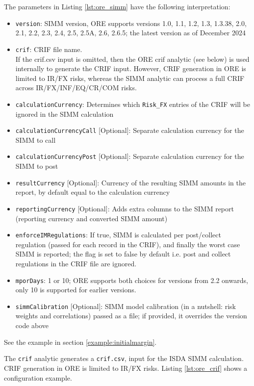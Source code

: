{The parameters in Listing \ref{lst:ore_simm} have the following interpretation:

\begin{itemize}
\item {\tt version}: SIMM version, ORE supports versions 1.0, 1.1, 1.2, 1.3, 1.3.38, 2.0, 2.1, 2.2, 2.3, 2.4, 2.5, 2.5A, 2.6, 2.6.5; the latest version as of December 2024
\item {\tt crif}: CRIF file name. \\
  If the crif.csv input is omitted, then the ORE crif analytic (see below) is used internally to generate the CRIF input.
  However, CRIF generation in ORE is limited to IR/FX risks, whereas the SIMM analytic can process a full CRIF across
  IR/FX/INF/EQ/CR/COM risks.
\item {\tt calculationCurrency}: Determines which {\tt Risk\_FX} entries of the CRIF will be ignored
  in the SIMM calculation
\item {\tt calculationCurrencyCall} [Optional]: Separate calculation currency for the SIMM to call
\item {\tt calculationCurrencyPost} [Optional]: Separate calculation currency for the SIMM to post
\item {\tt resultCurrency} [Optional]: Currency of the resulting SIMM amounts in the report, by default equal to the calculation currency
\item {\tt reportingCurrency} [Optional]: Adds extra columns to the SIMM report (reporting currency and converted SIMM amount)
\item {\tt enforceIMRegulations}: If true, SIMM is calculated per post/collect regulation (passed for each record in the CRIF), and finally the worst case SIMM is reported; the flag is set to false by default i.e. post and collect regulations in the CRIF file are ignored. 
\item {\tt mporDays}: 1 or 10; ORE supports both choices for versions from 2.2 onwards, only 10 is supported for earlier versions. 
\item {\tt simmCalibration} [Optional]: SIMM model calibration (in a nutshell: risk weights and correlations) passed as a file; if provided, it overrides the version code above
\end{itemize}

See the example in section \ref{example:initialmargin}.

\medskip
The {\tt crif} analytic generates a {\tt crif.csv}, input for the ISDA SIMM calculation.
CRIF generation in ORE is limited to IR/FX risks.
Listing \ref{lst:ore_crif} shows a configuration example.

}
